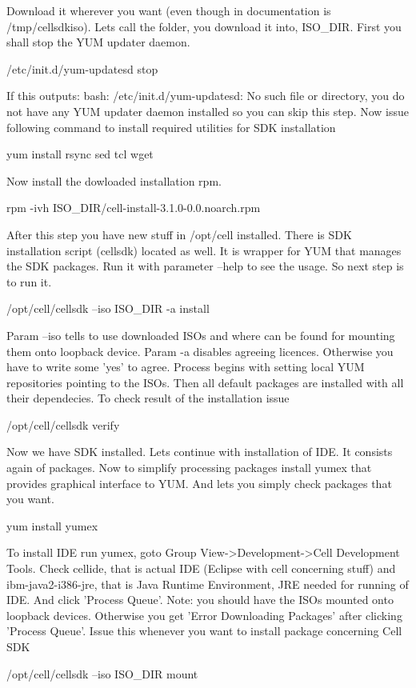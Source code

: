 \documentclass{article}
\begin{document}
Download it wherever you want (even though in documentation is /tmp/cellsdkiso). Lets call the folder, you download it into, ISO_DIR.  First you shall stop the YUM updater daemon.

/etc/init.d/yum-updatesd stop

If this outputs: bash: /etc/init.d/yum-updatesd: No such file or directory, you do not have any YUM updater daemon installed so you can skip this step. Now issue following command to install required utilities for SDK installation

yum install rsync sed tcl wget

Now install the dowloaded installation rpm.

rpm -ivh ISO_DIR/cell-install-3.1.0-0.0.noarch.rpm

After this step you have new stuff in /opt/cell installed. There is SDK installation script (cellsdk) located as well. It is wrapper for YUM that manages the SDK packages. Run it with parameter --help to see the usage. So next step is to run it. 

/opt/cell/cellsdk --iso ISO_DIR -a install

Param --iso tells to use downloaded ISOs and where can be found for mounting them onto loopback device. Param -a disables agreeing licences. Otherwise you have to write some 'yes' to agree. Process begins with setting local YUM repositories pointing to the ISOs. Then all default packages are installed with all their dependecies. To check result of the installation issue

/opt/cell/cellsdk verify

Now we have SDK installed. Lets continue with installation of IDE. It consists again of packages. Now to simplify processing packages install yumex that provides graphical interface to YUM. And lets you simply check packages that you want.

yum install yumex

To install IDE run yumex, goto Group View->Development->Cell Development Tools. Check cellide, that is actual IDE (Eclipse with cell concerning stuff) and ibm-java2-i386-jre, that is Java Runtime Environment, JRE needed for running of IDE. And click 'Process Queue'. Note: you should have the ISOs mounted onto loopback devices. Otherwise you get 'Error Downloading Packages' after clicking 'Process Queue'. Issue this whenever you want to install package concerning Cell SDK

/opt/cell/cellsdk --iso ISO_DIR mount
\end{document}
